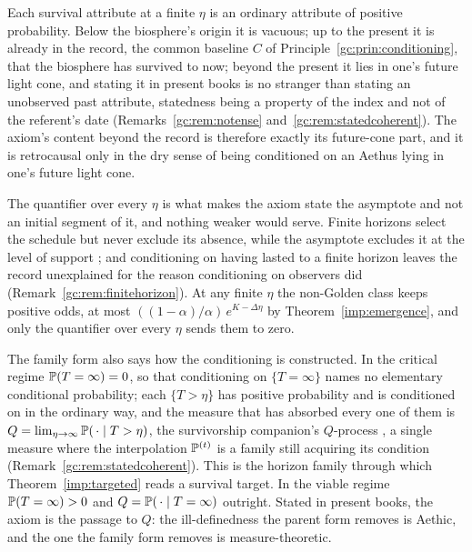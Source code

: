 \begin{remark}\label{gc:rem:axiometa}
Each survival attribute at a finite $\eta$ is an ordinary attribute of
positive probability. Below the biosphere's origin it is vacuous; up to
the present it is already in the record, the common baseline $C$ of
Principle~\ref{gc:prin:conditioning}, that the biosphere has survived to
now; beyond the present it lies in one's future light cone, and stating
it in present books is no stranger than stating an unobserved past
attribute, statedness being a property of the index and not of the
referent's date (Remarks~\ref{gc:rem:notense}
and~\ref{gc:rem:statedcoherent}). The axiom's content beyond the record
is therefore exactly its future-cone part, and it is retrocausal only in
the dry sense of being conditioned on an Aethus lying in one's future
light cone.

The quantifier over every $\eta$ is what makes the axiom state the
asymptote and not an initial segment of it, and nothing weaker would
serve. Finite horizons select the schedule but never exclude its absence,
while the asymptote excludes it at the level of support
\cite{GoldenTechnoanatomy}; and conditioning on having lasted to a finite
horizon leaves the record unexplained for the reason conditioning on
observers did (Remark~\ref{gc:rem:finitehorizon}). At any finite $\eta$
the non-Golden class keeps positive odds, at most
$((1-\alpha)/\alpha)\,e^{K-\Delta\eta}$ by Theorem~\ref{imp:emergence},
and only the quantifier over every $\eta$ sends them to zero.

The family form also says how the conditioning is constructed. In the
critical regime $\mathbb{P}(T=\infty)=0$, so that conditioning on $\{T=\infty\}$
names no elementary conditional probability; each $\{T>\eta\}$ has
positive probability and is conditioned on in the ordinary way, and the
measure that has absorbed every one of them is
$Q=\lim_{\eta\to\infty}\mathbb{P}(\,\cdot\mid T>\eta)$, the survivorship
companion's $Q$-process \cite{GoldenSurvivorship}, a single measure where
the interpolation $\mathbb{P}^{(t)}$ is a family still acquiring its condition
(Remark~\ref{gc:rem:statedcoherent}). This is the horizon family through
which Theorem~\ref{imp:targeted} reads a survival target. In the viable
regime $\mathbb{P}(T=\infty)>0$ and $Q=\mathbb{P}(\,\cdot\mid T=\infty)$ outright.
Stated in present books, the axiom is the passage to $Q$: the
ill-definedness the parent form removes is Aethic, and the one the family
form removes is measure-theoretic.
\end{remark}

